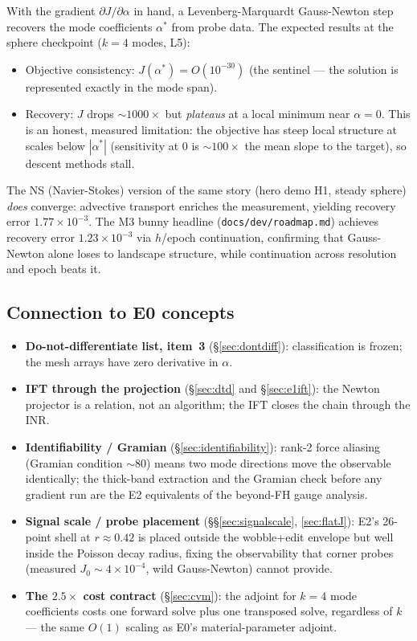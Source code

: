 \documentclass[11pt]{article}
\begin{document}
With the gradient $\partial J/\partial \alpha$ in hand, a Levenberg-Marquardt
Gauss-Newton step recovers the mode coefficients $\alpha^*$ from probe data.
The expected results at the sphere checkpoint ($k=4$ modes, L5):
\begin{itemize}
  \item Objective consistency: $J(\alpha^*) = O(10^{-30})$ (the sentinel ---
    the solution is represented exactly in the mode span).
  \item Recovery: $J$ drops $\sim 1000\times$ but \emph{plateaus} at a local
    minimum near $\alpha = 0$.  This is an honest, measured limitation: the
    objective has steep local structure at scales below $|\alpha^*|$
    (sensitivity at $0$ is $\sim 100\times$ the mean slope to the target),
    so descent methods stall.
\end{itemize}
The NS (Navier-Stokes) version of the same story (hero demo H1, steady
sphere) \emph{does} converge: advective transport enriches the measurement,
yielding recovery error $1.77 \times 10^{-3}$.  The M3 bunny headline
(\texttt{docs/dev/roadmap.md}) achieves recovery error $1.23 \times 10^{-3}$
via $h$/epoch continuation, confirming that Gauss-Newton alone loses to
landscape structure, while continuation across resolution and epoch beats it.

\subsection{Connection to E0 concepts}
\label{sec:e2e0connect}

\begin{itemize}
  \item \textbf{Do-not-differentiate list, item~3} (\S\ref{sec:dontdiff}):
    classification is frozen; the mesh arrays have zero derivative in $\alpha$.
  \item \textbf{IFT through the projection} (\S\ref{sec:dtd} and \S\ref{sec:e1ift}):
    the Newton projector is a relation, not an algorithm; the IFT closes the
    chain through the INR.
  \item \textbf{Identifiability / Gramian} (\S\ref{sec:identifiability}):
    rank-2 force aliasing (Gramian condition $\sim 80$) means two mode
    directions move the observable identically; the thick-band extraction and
    the Gramian check before any gradient run are the E2 equivalents of the
    beyond-FH gauge analysis.
  \item \textbf{Signal scale / probe placement} (\S\S\ref{sec:signalscale},
    \ref{sec:flatJ}): E2's 26-point shell at $r \approx 0.42$ is placed
    outside the wobble+edit envelope but well inside the Poisson decay radius,
    fixing the observability that corner probes (measured $J_0 \sim 4 \times
    10^{-4}$, wild Gauss-Newton) cannot provide.
  \item \textbf{The $2.5\times$ cost contract} (\S\ref{sec:cvm}): the
    adjoint for $k = 4$ mode coefficients costs one forward solve plus one
    transposed solve, regardless of $k$ --- the same $O(1)$ scaling as E0's
    material-parameter adjoint.
\end{itemize}
\end{document}
